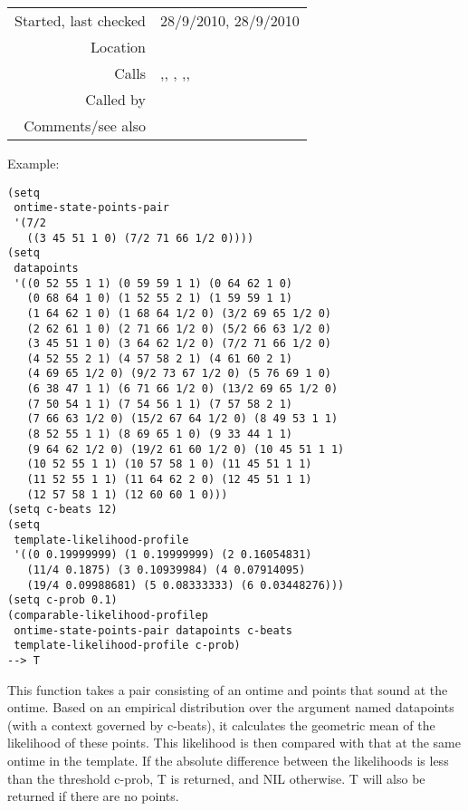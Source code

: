 \vspace{0.3cm}
\begin{tabular}{r|p{8cm}}
Started, last checked & 28/9/2010, 28/9/2010 \\
Location & \nameref{sec:generating-beat-MNN-spacing-forwards} \\
Calls & \nameref{fun:geom-mean-likelihood-of-subset},\newline \nameref{fun:linearly-interpolate}, \nameref{fun:max-item}, \nameref{fun:min-item},\newline \nameref{fun:nth-list-of-lists},\newline \nameref{fun:orthogonal-projection-not-unique-equalp} \\
Called by & \nameref{fun:checklistp} \\
Comments/see also & \nameref{fun:comparable-likelihood-profile<-p}
\end{tabular}

\vspace{0.5cm}
\noindent Example:
\begin{verbatim}
(setq
 ontime-state-points-pair
 '(7/2
   ((3 45 51 1 0) (7/2 71 66 1/2 0))))
(setq
 datapoints
 '((0 52 55 1 1) (0 59 59 1 1) (0 64 62 1 0)
   (0 68 64 1 0) (1 52 55 2 1) (1 59 59 1 1)
   (1 64 62 1 0) (1 68 64 1/2 0) (3/2 69 65 1/2 0)
   (2 62 61 1 0) (2 71 66 1/2 0) (5/2 66 63 1/2 0)
   (3 45 51 1 0) (3 64 62 1/2 0) (7/2 71 66 1/2 0)
   (4 52 55 2 1) (4 57 58 2 1) (4 61 60 2 1)
   (4 69 65 1/2 0) (9/2 73 67 1/2 0) (5 76 69 1 0)
   (6 38 47 1 1) (6 71 66 1/2 0) (13/2 69 65 1/2 0)
   (7 50 54 1 1) (7 54 56 1 1) (7 57 58 2 1)
   (7 66 63 1/2 0) (15/2 67 64 1/2 0) (8 49 53 1 1)
   (8 52 55 1 1) (8 69 65 1 0) (9 33 44 1 1)
   (9 64 62 1/2 0) (19/2 61 60 1/2 0) (10 45 51 1 1)
   (10 52 55 1 1) (10 57 58 1 0) (11 45 51 1 1)
   (11 52 55 1 1) (11 64 62 2 0) (12 45 51 1 1)
   (12 57 58 1 1) (12 60 60 1 0)))
(setq c-beats 12)
(setq
 template-likelihood-profile
 '((0 0.19999999) (1 0.19999999) (2 0.16054831)
   (11/4 0.1875) (3 0.10939984) (4 0.07914095)
   (19/4 0.09988681) (5 0.08333333) (6 0.03448276)))
(setq c-prob 0.1)
(comparable-likelihood-profilep
 ontime-state-points-pair datapoints c-beats
 template-likelihood-profile c-prob)
--> T
\end{verbatim}

\noindent This function takes a pair consisting of an
ontime and points that sound at the ontime. Based on
an empirical distribution over the argument named
datapoints (with a context governed by c-beats), it
calculates the geometric mean of the likelihood of
these points. This likelihood is then compared with
that at the same ontime in the template. If the
absolute difference between the likelihoods is less
than the threshold c-prob, T is returned, and NIL
otherwise. T will also be returned if there are no
points.


